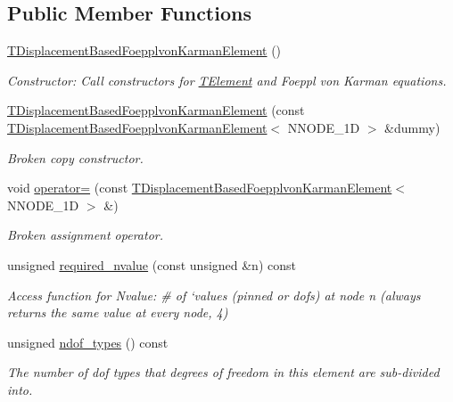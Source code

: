 \subsection*{Public Member Functions}
\begin{DoxyCompactItemize}
\item 
\hyperlink{classoomph_1_1TDisplacementBasedFoepplvonKarmanElement_a076673af7606f66f5e2da7a8ffa80949}{T\+Displacement\+Based\+Foepplvon\+Karman\+Element} ()
\begin{DoxyCompactList}\small\item\em Constructor\+: Call constructors for \hyperlink{classoomph_1_1TElement}{T\+Element} and Foeppl von Karman equations. \end{DoxyCompactList}\item 
\hyperlink{classoomph_1_1TDisplacementBasedFoepplvonKarmanElement_a4ea3b406605215c3254b9cfbcdbdbba8}{T\+Displacement\+Based\+Foepplvon\+Karman\+Element} (const \hyperlink{classoomph_1_1TDisplacementBasedFoepplvonKarmanElement}{T\+Displacement\+Based\+Foepplvon\+Karman\+Element}$<$ N\+N\+O\+D\+E\+\_\+1D $>$ \&dummy)
\begin{DoxyCompactList}\small\item\em Broken copy constructor. \end{DoxyCompactList}\item 
void \hyperlink{classoomph_1_1TDisplacementBasedFoepplvonKarmanElement_a79316486291f8ab93115411901fe49a4}{operator=} (const \hyperlink{classoomph_1_1TDisplacementBasedFoepplvonKarmanElement}{T\+Displacement\+Based\+Foepplvon\+Karman\+Element}$<$ N\+N\+O\+D\+E\+\_\+1D $>$ \&)
\begin{DoxyCompactList}\small\item\em Broken assignment operator. \end{DoxyCompactList}\item 
unsigned \hyperlink{classoomph_1_1TDisplacementBasedFoepplvonKarmanElement_a85ccfc34138dd1d839ad18eb17ca0e4c}{required\+\_\+nvalue} (const unsigned \&n) const
\begin{DoxyCompactList}\small\item\em Access function for Nvalue\+: \# of `values\textquotesingle{} (pinned or dofs) at node n (always returns the same value at every node, 4) \end{DoxyCompactList}\item 
unsigned \hyperlink{classoomph_1_1TDisplacementBasedFoepplvonKarmanElement_a860284d46ca7b85c519464ec2a6666ec}{ndof\+\_\+types} () const
\begin{DoxyCompactList}\small\item\em The number of dof types that degrees of freedom in this element are sub-\/divided into. \end{DoxyCompactList}\item 

\end{DoxyCompactItemize}
